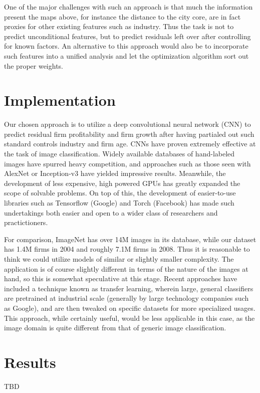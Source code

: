 \documentclass[12pt]{article}
\begin{document}
One of the major challenges with such an approach is that much the information present the maps above, for instance the distance to the city core, are in fact proxies for other existing features such as industry. Thus the task is not to predict unconditional features, but to predict residuals left over after controlling for known factors. An alternative to this approach would also be to incorporate such features into a unified analysis and let the optimization algorithm sort out the proper weights.

\section{Implementation}

Our chosen approach is to utilize a deep convolutional neural network (CNN) to predict residual firm profitability and firm growth after having partialed out such standard controls industry and firm age. CNNs have proven extremely effective at the task of image classification. Widely available databases of hand-labeled images have spurred heavy competition, and approaches such as those seen with AlexNet or Inception-v3 have yielded impressive results. Meanwhile, the development of less expensive, high powered GPUs has greatly expanded the scope of solvable problems. On top of this, the development of easier-to-use libraries such as Tensorflow (Google) and Torch (Facebook) has made such undertakings both easier and open to a wider class of researchers and practictioners.

For comparison, ImageNet has over 14M images in its database, while our dataset has 1.4M firms in 2004 and roughly 7.1M firms in 2008. Thus it is reasonable to think we could utilize models of similar or slightly smaller complexity. The application is of course slightly different in terms of the nature of the images at hand, so this is somewhat speculative at this stage. Recent approaches have included a technique known as transfer learning, wherein large, general classifiers are pretrained at industrial scale (generally by large technology companies such as Google), and are then tweaked on specific datasets for more specialized usages. This approach, while certainly useful, would be less applicable in this case, as the image domain is quite different from that of generic image classification.

\section{Results}

TBD


\end{document}
